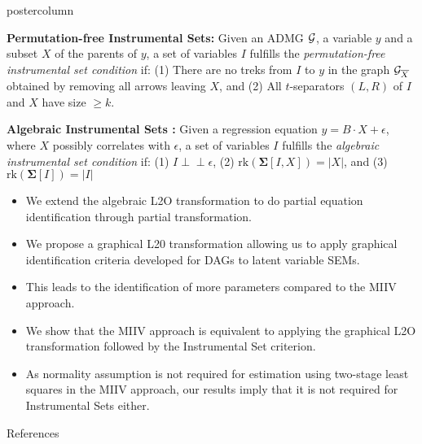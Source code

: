 \documentclass{beamer}
\def\ci{\perp\!\!\!\!\!\perp}
\begin{document}
\begin{frame}
\begin{columns}
\begin{column}{0.33\textwidth}
\begin{beamercolorbox}[center]{postercolumn}
\begin{minipage}{.98\textwidth}
{\begin{myblock}{}
		\textbf{Permutation-free Instrumental Sets:}
			\justifying Given an ADMG $\cal G$, a variable $y$ and a subset $X$ of the parents
			of $y$, a set of variables $I$ fulfills the \emph{permutation-free
			instrumental set condition} if: (1) There are no treks from $I$ to $y$
			in the graph ${\cal G}_{\overline{X}}$ obtained by removing all arrows
			leaving $X$, and (2) All $t$-separators $(L,R)$ of $I$ and $X$ have
			size $\geq k$.
		\vspace{0.5em}

		\textbf{Algebraic Instrumental Sets \citep{bollen2012instrumental}:}
			\justifying Given a regression equation $y = B \cdot X + \epsilon$, where $X$ possibly
			correlates with $\epsilon$, a set of variables
			$I$ fulfills the \emph{algebraic instrumental set condition} if: (1) $I \ci \epsilon$,
			(2) $\textrm{rk}(\bm{\Sigma}[I,X]) = |X|$, and (3) $\textrm{rk}(\bm{\Sigma}[I]) = |I|$
		
	\end{myblock}\vfill
	\begin{myblock}{}
		\begin{itemize}
			\item \justifying We extend the algebraic L2O transformation to do partial equation identification through partial transformation.
			\item \justifying We propose a graphical L20 transformation allowing us to apply graphical identification criteria developed for DAGs to latent variable SEMs.
			\item \justifying This leads to the identification of more parameters compared to the MIIV approach.
			\item \justifying We show that the MIIV approach is equivalent to applying the graphical L2O transformation followed by the Instrumental Set criterion.
			\item \justifying As normality assumption is not required for estimation using two-stage least squares in the MIIV approach, our results imply 
				that it is not required for Instrumental Sets either.
		\end{itemize}
	\end{myblock}\vfill
	\begin{myblock}{References}
		\footnotesize
		
		
	\end{myblock}\vfill
		}\end{minipage}\end{beamercolorbox}
	\end{column}
\end{columns}
\end{frame}
\end{document}
